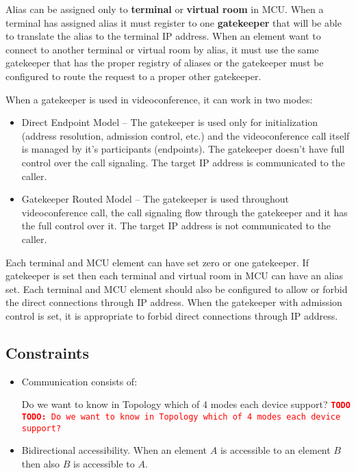 \documentclass[a4paper]{report}
\newcommand{\TODO}[1]{%
\def\empty{}%
\def\prvniparametr{#1}%
\ifx\prvniparametr\empty%
\begingroup\tt\textcolor{red}{\noindent\textbf{TODO}}\endgroup
\else%
\begingroup\tt\textcolor{red}{\noindent\textbf{TODO:}\ #1}\endgroup
\fi%
}
\begin{document}
Alias can be assigned only to \textbf{terminal} or \textbf{virtual room} in MCU. When a terminal has assigned alias it must register to one \textbf{gatekeeper} that will be able to translate the alias to the terminal IP address. When an element want to connect to another terminal or virtual room by alias, it must use the same gatekeeper that has the proper registry of aliases or the gatekeeper must be configured to route the request to a proper other gatekeeper.

When a gatekeeper is used in videoconference, it can work in two modes:
\begin{itemize}
\item Direct Endpoint Model -- The gatekeeper is used only for initialization (address resolution, admission control, etc.) and the videoconference call itself is managed by it's participants (endpoints). The gatekeeper doesn't have full control over the call signaling. The target IP address is communicated to the caller.
\item Gatekeeper Routed Model -- The gatekeeper is used throughout videoconference call, the call signaling flow through the gatekeeper and it has the full control over it. The target IP address is not communicated to the caller.
\end{itemize}

Each terminal and MCU element can have set zero or one gatekeeper. If gatekeeper is set then each terminal and virtual room in MCU can have an alias set. Each terminal and MCU element should also be configured to allow or forbid the direct connections through IP address. When the gatekeeper with admission control is set, it is appropriate to forbid direct connections through IP address.

\subsection{Constraints}

\begin{itemize}
\item Communication consists of:
\TODO{Do we want to know in Topology which of 4 modes each device support?}

\item Bidirectional accessibility. When an element $A$ is accessible to an element $B$ then also $B$ is accessible to $A$.
\end{itemize}
\end{document}
